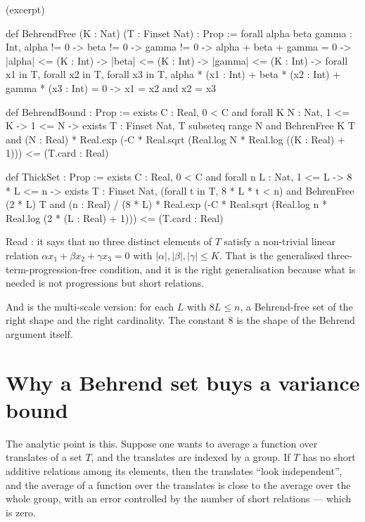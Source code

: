 \begin{seamnote}{ (excerpt)}
{\footnotesize
\begin{leanquote}
def BehrendFree (K : Nat) (T : Finset Nat) : Prop :=
forall alpha beta gamma : Int, alpha != 0 -> beta != 0 ->
    gamma != 0 -> alpha + beta + gamma = 0 ->
|alpha| <= (K : Int) -> |beta| <= (K : Int) -> |gamma| <= (K
      : Int) ->
    forall x1 in T, forall x2 in T, forall x3 in T,
alpha * (x1 : Int) + beta * (x2 : Int) + gamma * (x3 : Int)
        = 0 -> x1 = x2 and x2 = x3

def BehrendBound : Prop := exists C : Real, 0 < C and
  forall K N : Nat, 1 <= K -> 1 <= N ->
exists T : Finset Nat, T subseteq range N and BehrenFree K T
      and
(N : Real) * Real.exp (-C * Real.sqrt (Real.log N * Real.log
        ((K : Real) + 1))) <= (T.card : Real)

def ThickSet : Prop := exists C : Real, 0 < C and
  forall n L : Nat, 1 <= L -> 8 * L <= n ->
exists T : Finset Nat, (forall t in T, 8 * L * t < n) and
      BehrenFree (2 * L) T and
(n : Real) / (8 * L) * Real.exp (-C * Real.sqrt (Real.log n
        * Real.log (2 * (L : Real) + 1)))
        <= (T.card : Real)
\end{leanquote}
}
\end{seamnote}

Read : it says that no three distinct elements of $T$ satisfy
a non-trivial linear relation $\alpha x_1 + \beta x_2 + \gamma x_3 = 0$ with
$|\alpha|, |\beta|, |\gamma| \le K$. That is the generalised
three-term-progression-free condition, and it is the right generalisation
because what is needed is not progressions but short relations.

And  is the multi-scale version: for each $L$ with $8L \le n$,
a Behrend-free set of the right shape and the right cardinality. The constant
$8$ is the shape of the Behrend argument itself.

\section{Why a Behrend set buys a variance bound}The analytic point is this. Suppose one wants to average a function over
translates of a set $T$, and the translates are indexed by a group. If $T$ has
no short additive relations among its elements, then the translates
``look independent'', and the average of a function over the translates is
close to the average over the whole group, with an error controlled by the
number of short relations --- which is zero.

